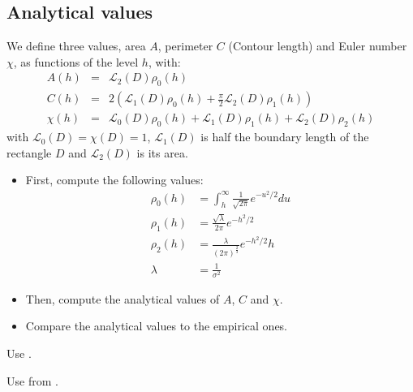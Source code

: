 \subsection{Analytical values}
We define three values, area $A$, perimeter $C$ (Contour length) and Euler number $\chi$, as functions of the level $h$, with:
\begin{eqnarray}
 A(h) &=& \mathcal{L}_2(D)\rho_0(h) \\
 C(h) &=& 2\left(\mathcal{L}_1(D)\rho_0(h) + \frac{\pi}{2}\mathcal{L}_2(D) \rho_1(h)\right)\\
 \chi(h) &=& \mathcal{L}_0(D)\rho_0(h) + \mathcal{L}_1(D)\rho_1(h)+\mathcal{L}_2(D) \rho_2(h)
\end{eqnarray}
with $\mathcal{L}_0(D)=\chi(D)=1$, $\mathcal{L}_1(D)$ is half the boundary length of the rectangle $D$ and $\mathcal{L}_2(D)$ is its area.

\begin{qbox}
\begin{itemize} \item First, compute the following values:
 \begin{align}
  \rho_0(h) &= \int_h^\infty \frac{1}{\sqrt{2\pi}} e^{-u^2/2}du \\
  \rho_1(h) &= \frac{\sqrt{\lambda}}{2\pi}e^{-h^2/2} \\
  \rho_2(h) &= \frac{\lambda}{(2\pi)^{\frac{2}{3}}}e^{-h^2/2}h \\
  \lambda &= \frac{1}{\sigma^2}
 \end{align}
 
 \item Then, compute the analytical values of $A$, $C$ and $\chi$.
 \item Compare the analytical values to the empirical ones.
 \end{itemize}
\end{qbox}

\begin{mcomment}
\begin{mremark}
Use .
\end{mremark}
\end{mcomment}

\begin{pcomment}
\begin{premark}
Use  from .
\end{premark}
\end{pcomment}

